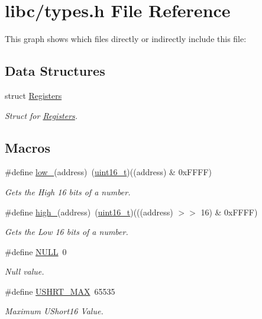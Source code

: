 \hypertarget{a00116}{}\section{libc/types.h File Reference}
\label{a00116}
This graph shows which files directly or indirectly include this file\+:
\subsection*{Data Structures}
\begin{DoxyCompactItemize}
\item 
struct \hyperlink{a00218}{Registers}
\begin{DoxyCompactList}\small\item\em Struct for \hyperlink{a00218}{Registers}. \end{DoxyCompactList}\end{DoxyCompactItemize}
\subsection*{Macros}
\begin{DoxyCompactItemize}
\item 
\#define \hyperlink{a00116_aded7ad58a4bedfffea10d5ae9c0c817e_aded7ad58a4bedfffea10d5ae9c0c817e}{low\+\_}(address)~(\hyperlink{a00116_a273cf69d639a59973b6019625df33e30_a273cf69d639a59973b6019625df33e30}{uint16\+\_\+t})((address) \& 0x\+F\+F\+F\+F)
\begin{DoxyCompactList}\small\item\em Gets the High 16 bits of a number. \end{DoxyCompactList}\item 
\#define \hyperlink{a00116_a0a63db19c3e2153ed419aeccf4e33c92_a0a63db19c3e2153ed419aeccf4e33c92}{high\+\_}(address)~(\hyperlink{a00116_a273cf69d639a59973b6019625df33e30_a273cf69d639a59973b6019625df33e30}{uint16\+\_\+t})(((address) $>$$>$ 16) \& 0x\+F\+F\+F\+F)
\begin{DoxyCompactList}\small\item\em Gets the Low 16 bits of a number. \end{DoxyCompactList}\item 
\#define \hyperlink{a00116_a070d2ce7b6bb7e5c05602aa8c308d0c4_a070d2ce7b6bb7e5c05602aa8c308d0c4}{N\+U\+LL}~0
\begin{DoxyCompactList}\small\item\em Null value. \end{DoxyCompactList}\item 
\#define \hyperlink{a00116_a689b119da994dece91d44b5aeac643ed_a689b119da994dece91d44b5aeac643ed}{U\+S\+H\+R\+T\+\_\+\+M\+AX}~65535
\begin{DoxyCompactList}\small\item\em Maximum U\+Short16 Value. \end{DoxyCompactList}\end{DoxyCompactItemize}
